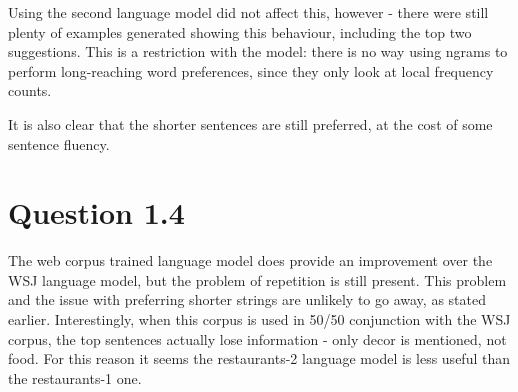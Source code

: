 \documentclass[a4paper,11pt,oneside]{article}
\begin{document}
Using the second language model did not affect this, however - there were still plenty of examples generated showing this behaviour, including the top two suggestions. This is a restriction with the model: there is no way using ngrams to perform long-reaching word preferences, since they only look at local frequency counts.

It is also clear that the shorter sentences are still preferred, at the cost of some sentence fluency.

\section{Question 1.4}
The web corpus trained language model does provide an improvement over the WSJ language model, but the problem of repetition is still present. This problem and the issue with preferring shorter strings are unlikely to go away, as stated earlier. Interestingly, when this corpus is used in 50/50 conjunction with the WSJ corpus, the top sentences actually lose information - only decor is mentioned, not food. For this reason it seems the restaurants-2 language model is less useful than the restaurants-1 one.
\end{document}
